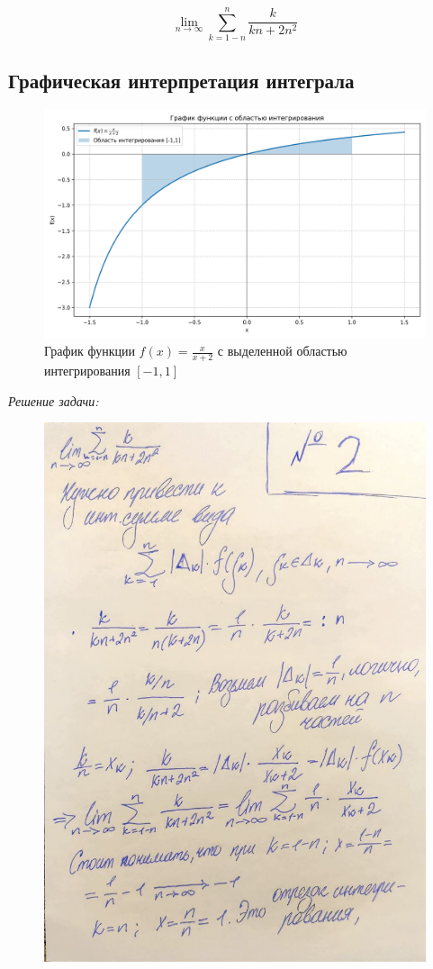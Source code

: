 \documentclass[a4paper,12pt]{article}
\begin{document}
\[
\lim_{n \to \infty} \sum_{k=1 - n}^{n} \frac{k}{kn + 2n^2}
\]

\subsection*{Графическая интерпретация интеграла}

\begin{figure}[H]
    \centering
    \includegraphics[width=0.9\linewidth]{../img/integral_plot.png}
    \caption{График функции $f(x) = \frac{x}{x+2}$ с выделенной областью интегрирования $[-1,1]$}
    \label{fig:integral}
\end{figure}

\emph{Решение задачи:}

\begin{figure}[H]
    \centering
    \includegraphics[width=0.8\linewidth]{../img/2_1.jpg}
    \caption{}
    \label{fig:part1}
\end{figure}
\end{document}
